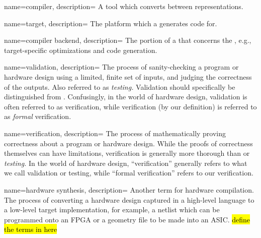 
\DeclareRobustCommand{\glossfirstformat}[1]{\textit{#1}}
\renewcommand*{\glsdisplayfirst}[4]{\glossfirstformat{#1#4}}
\usepackage[normalem]{ulem}
\renewcommand*{\glstextformat}[1]{\color{lightgray}{\dotuline{\color{black} #1}}}


\makenoidxglossaries


{
    name=compiler,
    description={
A tool which converts between representations.
    }
}


{
    name=target,
    description={
The platform which a  generates code for.
    }
}

{
    name=compiler backend,
    description={
The portion of a  that concerns the ,
  e.g., target-specific optimizations and code generation.
    }
}

{
    name=validation,
    description={
The process of sanity-checking a program or hardware design using a
  limited, finite set
  of inputs, and judging the correctness 
  of the outputs.
Also referred to as \textit{testing.}
Validation should specifically be distinguished from
  .
Confusingly, 
  in the world of hardware design,
  validation is often referred to as
  verification,
  while verification (by our definition)
  is referred to as \textit{formal} verification.
    }
}

{
    name=verification,
    description={
The process of mathematically proving correctness
  about a program or hardware design.
While the proofs of correctness themselves
  can have limitations,
  verification is generally more thorough
  than  or \textit{testing.}
In the world of hardware design,
  ``verification''
  generally refers to what we call validation or testing,
  while ``formal verification''
  refers to our verification.
    }
}

{
    name={hardware synthesis},
    description={
Another term for hardware compilation.
The process of converting a hardware design
  captured in a high-level language
  to a low-level target implementation,
  for example,
  a netlist which can be programmed onto an FPGA
  or a geometry file to be made into an ASIC.
  \hl{define the terms in here}
    }
}

